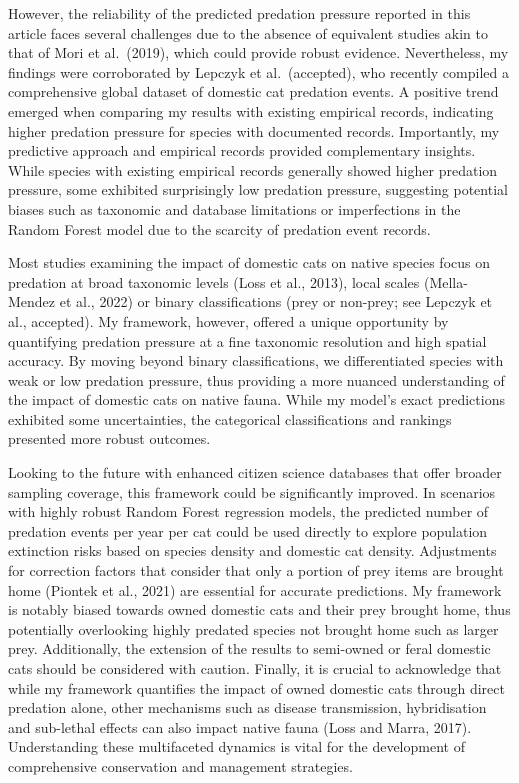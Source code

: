 \documentclass[
  super,
  review,
  3p]{elsarticle}
\begin{document}
However, the reliability of the predicted predation pressure reported in
this article faces several challenges due to the absence of equivalent
studies akin to that of Mori et al.~(2019), which could provide robust
evidence. Nevertheless, my findings were corroborated by Lepczyk et
al.~(accepted), who recently compiled a comprehensive global dataset of
domestic cat predation events. A positive trend emerged when comparing
my results with existing empirical records, indicating higher predation
pressure for species with documented records. Importantly, my predictive
approach and empirical records provided complementary insights. While
species with existing empirical records generally showed higher
predation pressure, some exhibited surprisingly low predation pressure,
suggesting potential biases such as taxonomic and database limitations
or imperfections in the Random Forest model due to the scarcity of
predation event records.

Most studies examining the impact of domestic cats on native species
focus on predation at broad taxonomic levels (Loss et al., 2013), local
scales (Mella-Mendez et al., 2022) or binary classifications (prey or
non-prey; see Lepczyk et al., accepted). My framework, however, offered
a unique opportunity by quantifying predation pressure at a fine
taxonomic resolution and high spatial accuracy. By moving beyond binary
classifications, we differentiated species with weak or low predation
pressure, thus providing a more nuanced understanding of the impact of
domestic cats on native fauna. While my model's exact predictions
exhibited some uncertainties, the categorical classifications and
rankings presented more robust outcomes.

Looking to the future with enhanced citizen science databases that offer
broader sampling coverage, this framework could be significantly
improved. In scenarios with highly robust Random Forest regression
models, the predicted number of predation events per year per cat could
be used directly to explore population extinction risks based on species
density and domestic cat density. Adjustments for correction factors
that consider that only a portion of prey items are brought home
(Piontek et al., 2021) are essential for accurate predictions. My
framework is notably biased towards owned domestic cats and their prey
brought home, thus potentially overlooking highly predated species not
brought home such as larger prey. Additionally, the extension of the
results to semi-owned or feral domestic cats should be considered with
caution. Finally, it is crucial to acknowledge that while my framework
quantifies the impact of owned domestic cats through direct predation
alone, other mechanisms such as disease transmission, hybridisation and
sub-lethal effects can also impact native fauna (Loss and Marra, 2017).
Understanding these multifaceted dynamics is vital for the development
of comprehensive conservation and management strategies.
\end{document}
